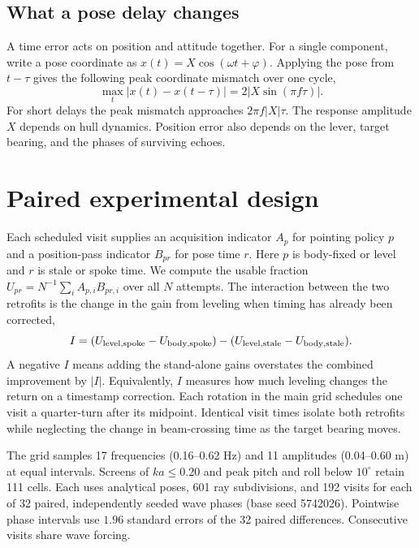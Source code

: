\documentclass[nofoot]{asmeconf}
\begin{document}
\subsection{What a pose delay changes}
A time error acts on position and attitude together. For a single component, write a pose coordinate as $x(t)=X\cos(\omega t+\varphi)$. Applying the pose from $t-\tau$ gives the following peak coordinate mismatch over one cycle,
\begin{equation}
 \max_t |x(t)-x(t-\tau)|=2|X\sin(\pi f\tau)|.
 \label{eq:pose-delay}
\end{equation}
For short delays the peak mismatch approaches $2\pi f|X|\tau$. The response amplitude $X$ depends on hull dynamics. Position error also depends on the lever, target bearing, and the phases of surviving echoes.

\section{Paired experimental design}
Each scheduled visit supplies an acquisition indicator $A_p$ for pointing policy $p$ and a position-pass indicator $B_{pr}$ for pose time $r$. Here $p$ is body-fixed or level and $r$ is stale or spoke time. We compute the usable fraction $U_{pr}=N^{-1}\sum_i A_{p,i}B_{pr,i}$ over all $N$ attempts. The interaction between the two retrofits is the change in the gain from leveling when timing has already been corrected,
\begin{equation}
 I=(U_{\rm level,spoke}-U_{\rm body,spoke})
   -(U_{\rm level,stale}-U_{\rm body,stale}).
 \label{eq:interaction}
\end{equation}
A negative $I$ means adding the stand-alone gains overstates the combined improvement by $|I|$. Equivalently, $I$ measures how much leveling changes the return on a timestamp correction. Each rotation in the main grid schedules one visit a quarter-turn after its midpoint. Identical visit times isolate both retrofits while neglecting the change in beam-crossing time as the target bearing moves.

The grid samples 17 frequencies (0.16--0.62 Hz) and 11 amplitudes (0.04--0.60 m) at equal intervals. Screens of $ka\le0.20$ and peak pitch and roll below $10^\circ$ retain 111 cells. Each uses analytical poses, 601 ray subdivisions, and 192 visits for each of 32 paired, independently seeded wave phases (base seed 5742026). Pointwise phase intervals use $1.96$ standard errors of the 32 paired differences. Consecutive visits share wave forcing.
\end{document}
